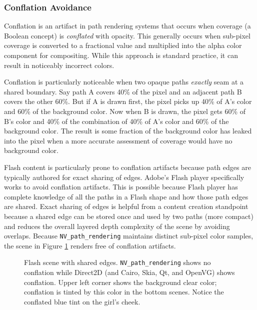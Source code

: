 \subsubsection{Conflation Avoidance}

Conflation is an artifact in path rendering systems that occurs when
coverage (a Boolean concept) is {\em conflated} with opacity.  This generally
occurs when sub-pixel coverage is converted to a fractional value and
multiplied into the alpha color component for compositing.  While this
approach is standard practice, it can result in noticeably incorrect
colors.

Conflation is particularly noticeable when two opaque paths {\em exactly} seam
at a shared boundary.  Say path A covers 40\% of the pixel and an adjacent
path B covers the other 60\%.  But if A is drawn first, the pixel picks
up 40\% of A's color and 60\% of the background color.  Now when B is
drawn, the pixel gets 60\% of B's color and 40\% of the combination of
40\% of A's color and 60\% of the background color.  The result is some
fraction of the background color has leaked into the pixel when a more
accurate assessment of coverage would have no background color.

Flash content is particularly prone to conflation artifacts because path
edges are typically authored for exact sharing of edges.  Adobe's Flash
player specifically works to avoid conflation artifacts.  This is possible
because Flash player has complete knowledge of all the paths in a Flash
shape and how those path edges are shared.  Exact sharing of edges is
helpful from a content creation standpoint because a shared edge can be
stored once and used by two paths (more compact) and reduces the overall
layered depth complexity of the scene by avoiding overlaps.
Because {\tt NV\_path\_rendering} maintains distinct sub-pixel color
samples, the scene in Figure \ref{fig:conflation-artifacts} renders free
of conflation artifacts.

\begin{figure}[tb]
  \caption{\label{fig:conflation-artifacts} Flash scene with shared edges.
  {\tt NV\_path\_rendering} shows no conflation while Direct2D (and Cairo,
  Skia, Qt, and OpenVG) shows conflation.  Upper left corner shows the
  background clear color; conflation is tinted by this color in the
  bottom scenes.  Notice the conflated blue tint on the girl's cheek.}
\end{figure}
 
